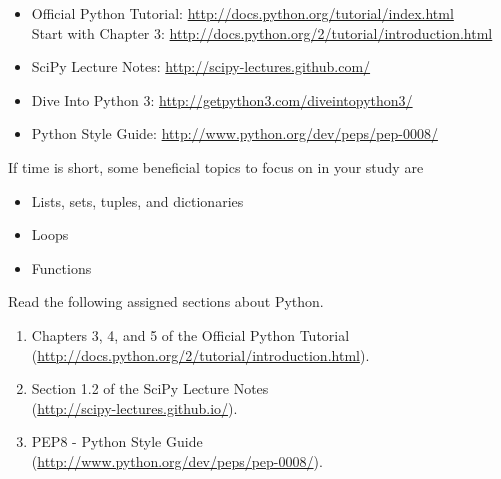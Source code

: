 \begin{itemize}
\item Official Python Tutorial: \url{http://docs.python.org/tutorial/index.html} \\
      Start with Chapter 3: \url{http://docs.python.org/2/tutorial/introduction.html}
\item SciPy Lecture Notes: \url{http://scipy-lectures.github.com/}
\item Dive Into Python 3: \url{http://getpython3.com/diveintopython3/}
\item Python Style Guide: \url{http://www.python.org/dev/peps/pep-0008/}
\end{itemize}
If time is short, some beneficial topics to focus on in your study are
\begin{itemize}
\item Lists, sets, tuples, and dictionaries
\item Loops
\item Functions
\end{itemize}

\begin{problem}
Read the following assigned sections about Python.
\begin{enumerate}
\item Chapters 3, 4, and 5 of the Official Python Tutorial \\
        (\url{http://docs.python.org/2/tutorial/introduction.html}).
\item Section 1.2 of the SciPy Lecture Notes \\
        (\url{http://scipy-lectures.github.io/}).
\item PEP8 - Python Style Guide \\
        (\url{http://www.python.org/dev/peps/pep-0008/}).
\end{enumerate}
\end{problem}

